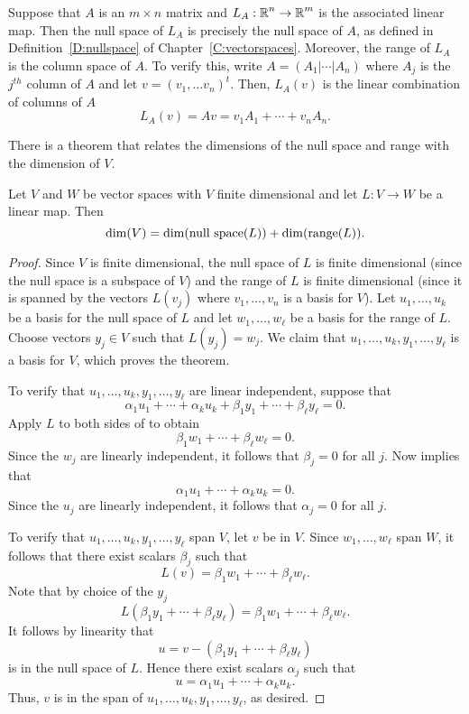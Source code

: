 \documentclass{ximera}
\begin{document}
Suppose that $A$ is an $m\times n$ matrix and $L_A:\mbox{$\Bbb{R}$}^n\to\mbox{$\Bbb{R}$}^m$ is the
associated linear map.  Then the null space of $L_A$ is precisely the null
space of $A$, as defined in Definition~\ref{D:nullspace} of 
Chapter~\ref{C:vectorspaces}.  Moreover, the range of $L_A$ is the column 
space of $A$.  To verify this, write $A=(A_1|\cdots|A_n)$ where $A_j$ is the 
$j^{th}$ column of $A$ and let $v=(v_1,\ldots v_n)^t$.  Then, $L_A(v)$ is the 
linear combination of columns of $A$
\[
L_A(v)=Av = v_1A_1+\cdots+v_nA_n.
\]

There is a theorem that relates the dimensions of the null space and range
with the dimension of $V$.
\begin{thm}  \label{T:nsr}
Let $V$ and $W$ be vector spaces with $V$ finite dimensional and let
$L:V\to W$ be a linear map.  Then
\[
\dim(V) = \dim(\mbox{\rm null space}(L)) + \dim({\rm range}(L)).
\] 
\end{thm}

\begin{proof}   Since $V$ is finite dimensional, the null space of $L$ is finite 
dimensional (since the null space is a subspace of $V$) and the range of $L$ 
is finite dimensional (since it is spanned by the vectors $L(v_j)$ where 
$v_1,\ldots,v_n$ is a basis for $V$).  Let $u_1,\ldots,u_k$ be a basis for 
the null space of $L$ and let $w_1,\ldots,w_\ell$ be a basis for the range of
$L$.   Choose vectors $y_j\in V$ such that $L(y_j)=w_j$.  We claim that
$u_1,\ldots,u_k,y_1,\ldots,y_\ell$ is a basis for $V$, which proves the
theorem.

To verify that $u_1,\ldots,u_k,y_1,\ldots,y_\ell$ are linear independent,
suppose that
\begin{equation}  \label{E:uy}
\alpha_1u_1+\cdots+\alpha_ku_k+\beta_1y_1+\cdots+\beta_\ell y_\ell = 0.
\end{equation}
Apply $L$ to both sides of  to obtain
\[
\beta_1w_1+\cdots+\beta_\ell w_\ell = 0.
\]
Since the $w_j$ are linearly independent, it follows that $\beta_j=0$ for all
$j$.  Now   implies that
\[
\alpha_1u_1+\cdots+\alpha_ku_k = 0.
\]
Since the $u_j$ are linearly independent, it follows that $\alpha_j=0$ for
all $j$.

To verify that $u_1,\ldots,u_k,y_1,\ldots,y_\ell$ span $V$, let $v$ be in
$V$.  Since $w_1,\ldots,w_\ell$ span $W$, it follows that there exist scalars
$\beta_j$ such that
\[
L(v) = \beta_1w_1+\cdots+\beta_\ell w_\ell.
\]
Note that by choice of the $y_j$
\[
L(\beta_1y_1+\cdots+\beta_\ell y_\ell) = \beta_1w_1+\cdots+\beta_\ell w_\ell.
\]
It follows by linearity that
\[
u = v - (\beta_1y_1+\cdots+\beta_\ell y_\ell)
\]
is in the null space of $L$.  Hence there exist scalars $\alpha_j$ such that
\[
u = \alpha_1u_1+\cdots+\alpha_ku_k.
\]
Thus, $v$ is in the span of $u_1,\ldots,u_k,y_1,\ldots,y_\ell$, as desired.
\end{proof}
\end{document}

